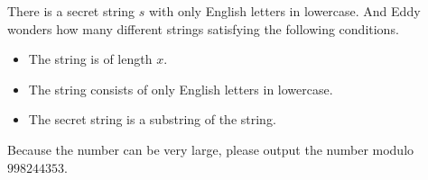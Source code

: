 There is a secret string $s$ with only English letters in lowercase.
And Eddy wonders how many different strings satisfying the following conditions.
\begin{itemize}
\item The string is of length $x$.
\item The string consists of only English letters in lowercase.
\item The secret string is a substring of the string.
\end{itemize}

Because the number can be very large, please output the number 
modulo $998244353$.
